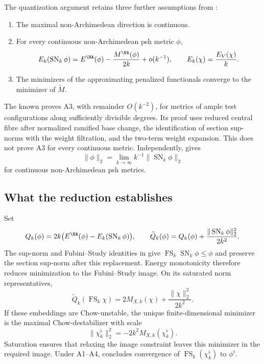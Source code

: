 The quantization argument retains three further assumptions from
\cite[\S7.1.2]{Yao25MaximalDestabilizers}:
\begin{enumerate}
\item[A2.] The maximal non-Archimedean direction is continuous.
\item[A3.] For every continuous non-Archimedean psh metric $\phi$,
\[
 E_k(\operatorname{SN}_k\phi)
 =E^{\NA}(\phi)-\frac{M^{\NA}(\phi)}{2k}+o(k^{-1}),
 \qquad E_k(\chi)=\frac{E_V(\chi)}k.
\]
\item[A4.] The minimizers of the approximating penalized functionals
converge to the minimizer of $\widetilde M$.
\end{enumerate}
The known \cite[Theorem~46]{Yao25MaximalDestabilizers} proves A3,
with remainder $O(k^{-2})$, for metrics of ample test
configurations along sufficiently divisible degrees. Its proof
uses reduced central fibre after normalized ramified base change,
the identification of section sup-norms with the weight filtration,
and the two-term weight expansion. This does not prove A3 for
every continuous metric. Independently,
\cite[Theorem~45]{Yao25MaximalDestabilizers} gives
\[
 \|\phi\|_2=\lim_{k\to\infty}k^{-1}
                 \|\operatorname{SN}_k\phi\|_2
\]
for continuous non-Archimedean psh metrics.

\subsection{What the reduction establishes}

Set
\[
 Q_k(\phi)=2k\bigl(E^{\NA}(\phi)-E_k(\operatorname{SN}_k\phi)\bigr),
 \qquad
 \widetilde Q_k(\phi)=Q_k(\phi)
             +\frac{\|\operatorname{SN}_k\phi\|_2^2}{2k^2}.
\]
The sup-norm and Fubini--Study identities in
\cite[Proposition~35]{Yao25MaximalDestabilizers} give
$\operatorname{FS}_k\operatorname{SN}_k\phi\leq\phi$ and
preserve the section sup-norm after this replacement. Energy
monotonicity therefore reduces minimization to the Fubini--Study
image. On its saturated norm representatives,
\[
 \widetilde Q_k(\operatorname{FS}_k\chi)
       =2M_{X,k}(\chi)+\frac{\|\chi\|_2^2}{2k^2}.
\]
If these embeddings are Chow-unstable, the unique finite-dimensional
minimizer is the maximal Chow-destabilizer with scale
\[
 \|\chi_k^\flat\|_2^2=-2k^2M_{X,k}(\chi_k^\flat).
\]
Saturation ensures that relaxing the image constraint leaves this
minimizer in the required image. Under A1--A4,
\cite[Theorem~4]{Yao25MaximalDestabilizers} concludes convergence
of $\operatorname{FS}_k(\chi_k^\flat)$ to $\phi^\flat$.

